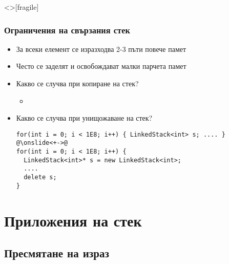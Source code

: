 \documentclass[alsotrans, beameroptions={aspectratio=169}]{beamerswitch}
\begin{document}
\begin{frame}<>[fragile]
  \frametitle{Ограничения на свързания стек}

  \begin{itemize}[<+->]
  \item За всеки елемент се изразходва 2-3 пъти повече памет
  \item Често се заделят и освобождават малки парчета памет
  \item Какво се случва при копиране на стек?
    \begin{itemize}
    \item {}
    \end{itemize}
  \item
    Какво се случва при унищожаване на стек?
\begin{lstlisting}
for(int i = 0; i < 1E8; i++) { LinkedStack<int> s; .... }
@\onslide<+->@
for(int i = 0; i < 1E8; i++) {
  LinkedStack<int>* s = new LinkedStack<int>;
  ....
  delete s;
}
\end{lstlisting}
  \end{itemize}
\end{frame}

\section{Приложения на стек}

\subsection{Пресмятане на израз}
\end{document}
